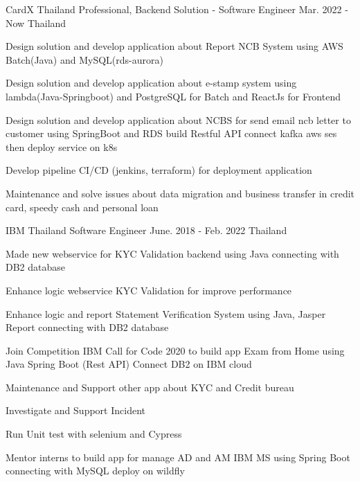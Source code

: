 

\begin{cventries}

\cventry
{CardX Thailand} %
{Professional, Backend Solution - Software Engineer} %
{Mar. 2022 - Now} %
{Thailand} %
{
  \begin{cvitems} %
    \item {Design solution and develop application about Report NCB System using AWS Batch(Java) and MySQL(rds-aurora)}
    \item {Design solution and develop application about e-stamp system using lambda(Java-Springboot) and PostgreSQL for Batch and ReactJs for Frontend}
    \item {Design solution and develop application about NCBS for send email ncb letter to customer using SpringBoot and RDS build Restful API connect kafka aws ses then deploy service on k8s}
    \item {Develop pipeline CI/CD (jenkins, terraform) for deployment application}
    \item {Maintenance and solve issues about data migration and business transfer in credit card, speedy cash and personal loan}
  \end{cvitems}
}

  \cventry
    {IBM Thailand} %
    {Software Engineer} %
    {June. 2018 - Feb. 2022} %
    {Thailand} %
    {
      \begin{cvitems} %
        \item {Made new webservice for KYC Validation backend using Java connecting with DB2 database}
        \item {Enhance logic webservice KYC Validation for improve performance}
        \item {Enhance logic and report Statement Verification System using Java, Jasper Report connecting with DB2 database}
        \item {Join Competition IBM Call for Code 2020 to build app Exam from Home using Java Spring Boot (Rest API) Connect DB2 on IBM cloud}
        \item {Maintenance and Support other app about KYC and Credit bureau}
        \item {Investigate and Support Incident}
        \item {Run Unit test with selenium and Cypress}
        \item {Mentor interns to build app for manage AD and AM IBM MS using Spring Boot connecting with MySQL deploy on wildfly}
      \end{cvitems}
    }


\end{cventries}
